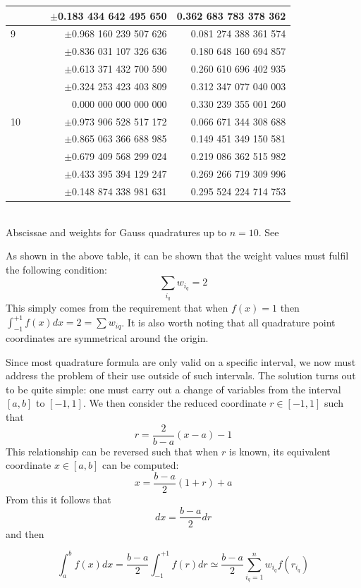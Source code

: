 \begin{center}
\begin{tabular}{lllrr}
  & & & $\pm$0.183 434 642 495 650 & 0.362 683 783 378 362\\
\hline
9 & & & $\pm$0.968 160 239 507 626 & 0.081 274 388 361 574\\
  & & & $\pm$0.836 031 107 326 636 & 0.180 648 160 694 857\\
  & & & $\pm$0.613 371 432 700 590 & 0.260 610 696 402 935\\
  & & & $\pm$0.324 253 423 403 809 & 0.312 347 077 040 003\\
  & & & 0.000 000 000 000 000 & 0.330 239 355 001 260\\
\hline
10 &&& $\pm$0.973 906 528 517 172 & 0.066 671 344 308 688\\
   &&& $\pm$0.865 063 366 688 985 & 0.149 451 349 150 581\\
   &&& $\pm$0.679 409 568 299 024 & 0.219 086 362 515 982\\
   &&& $\pm$0.433 395 394 129 247 & 0.269 266 719 309 996\\
   &&& $\pm$0.148 874 338 981 631 & 0.295 524 224 714 753\\
\hline
\end{tabular}\\
{\captionfont Abscissae and weights for Gauss quadratures up to $n=10$. See \cite[p89]{li06}}
\end{center}

As shown in the above table, it can be shown that the weight values must fulfil the following condition:
\begin{equation}
\sum_{i_q} w_{i_q}=2 \label{gq23}
\end{equation}
This simply comes from the requirement that when $f(x)=1$ then $\int_{-1}^{+1}f(x)dx=2=\sum w_{iq}$.
It is also worth noting that all quadrature point coordinates are symmetrical around the origin.

Since most quadrature formula are only valid on a specific interval, we now must address the problem 
of their use outside of such intervals. The solution turns out to be quite simple: one 
must carry out a change of variables from the interval $[a,b]$ to $[-1,1]$.
We then consider the reduced coordinate $r\in[-1,1]$ such that 
\begin{equation}
r=\frac{2}{b-a}(x-a)-1 
\end{equation}
This relationship can be reversed such that when $r$ is known, its equivalent coordinate 
$x\in[a,b]$ can be computed:
\begin{equation}
x=\frac{b-a}{2}(1+r)+a
\end{equation}
From this it follows that
\begin{equation}
dx=\frac{b-a}{2}dr
\end{equation}
and then 
\begin{mdframed}[backgroundcolor=blue!5]
\begin{equation}
\int_a^b f(x) dx  = \frac{b-a}{2} \int_{-1}^{+1} f(r) dr \simeq 
\frac{b-a}{2} \sum_{i_q=1}^n w_{i_q} f(r_{i_q})
\end{equation}
\end{mdframed}

